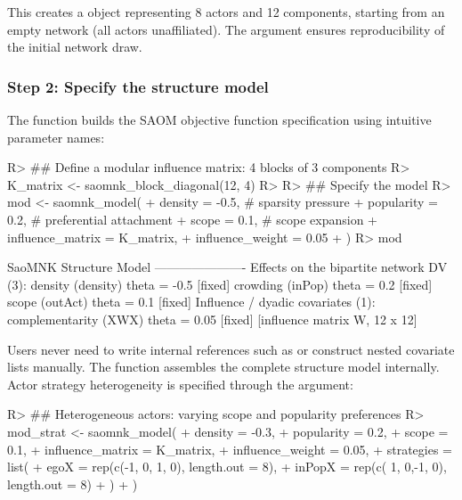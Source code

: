 \documentclass[
  article]{jss}
\begin{document}
This creates a  object representing 8 actors and
12 components, starting from an empty network (all actors unaffiliated).
The  argument ensures reproducibility of the initial network
draw.

\subsubsection{Step 2: Specify the structure
model}\label{step-2-specify-the-structure-model}

The  function builds the SAOM objective function
specification using intuitive parameter names:

\begin{CodeChunk}
\begin{CodeInput}
R> ## Define a modular influence matrix: 4 blocks of 3 components
R> K_matrix <- saomnk_block_diagonal(12, 4)
R> 
R> ## Specify the model
R> mod <- saomnk_model(
+   density    = -0.5,     # sparsity pressure
+   popularity =  0.2,     # preferential attachment
+   scope      =  0.1,     # scope expansion
+   influence_matrix = K_matrix,
+   influence_weight = 0.05
+ )
R> mod
\end{CodeInput}
\begin{CodeOutput}
SaoMNK Structure Model
----------------------
Effects on the bipartite network DV (3):
  density (density)      theta =   -0.5  [fixed]
  crowding (inPop)       theta =    0.2  [fixed]
  scope (outAct)         theta =    0.1  [fixed]
Influence / dyadic covariates (1):
  complementarity (XWX)  theta =   0.05  [fixed]  [influence matrix W, 12 x 12]
\end{CodeOutput}
\end{CodeChunk}

Users never need to write internal references such as
 or construct nested covariate lists
manually. The function assembles the complete  structure
model internally. Actor strategy heterogeneity is specified through the
 argument:

\begin{CodeChunk}
\begin{CodeInput}
R> ## Heterogeneous actors: varying scope and popularity preferences
R> mod_strat <- saomnk_model(
+   density    = -0.3,
+   popularity =  0.2,
+   scope      =  0.1,
+   influence_matrix = K_matrix,
+   influence_weight = 0.05,
+   strategies = list(
+     egoX   = rep(c(-1, 0, 1, 0), length.out = 8),
+     inPopX = rep(c( 1, 0,-1, 0), length.out = 8)
+   )
+ )
\end{CodeInput}
\end{CodeChunk}
\end{document}
